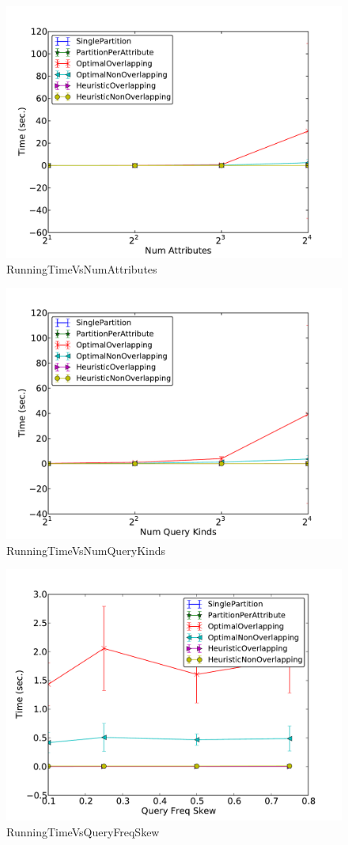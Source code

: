 \begin{figure}[ht]
\centerline{\includegraphics[width=0.9\columnwidth]{figures/RunningTimeVsNumAttributes.pdf}}
\caption{RunningTimeVsNumAttributes}
\end{figure}

\begin{figure}[ht]
\centerline{\includegraphics[width=0.9\columnwidth]{figures/RunningTimeVsNumQueryKinds.pdf}}
\caption{RunningTimeVsNumQueryKinds}
\end{figure}

\begin{figure}[ht]
\centerline{\includegraphics[width=0.9\columnwidth]{figures/RunningTimeVsQueryFreqSkew.pdf}}
\caption{RunningTimeVsQueryFreqSkew}
\end{figure}

